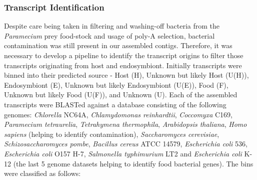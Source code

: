 \documentclass[a4paper,11pt]{article}
\begin{document}
\subsubsection{Transcript Identification}
Despite care being taken in filtering and washing-off bacteria from the \textit{Paramecium} prey food-stock and usage of poly-A selection, bacterial contamination was still present in our assembled contigs.  
Therefore, it was necessary to develop a pipeline to identify the transcript origins to filter those transcripts originating from host and endosymbiont. 
Initially transcripts were binned into their predicted source - Host (H), Unknown but likely Host (U(H)), Endosymbiont (E), Unknown but likely Endosymbiont (U(E)), Food (F), Unknown but likely Food (U(F)), and Unknown (U).  
Each of the assembled transcripts were BLASTed against a database consisting of the following genomes: \textit{Chlorella} NC64A, \textit{Chlamydomonas reinhardtii}, \textit{Coccomyxa} C169, \textit{Paramecium tetraurelia}, \textit{Tetrahymena thermophila},  \textit{Arabidopsis thaliana}, \textit{Homo sapiens} (helping to identify contamination), \textit{Saccharomyces cerevisiae}, \textit{Schizosaccharomyces pombe}, \textit{Bacillus cereus} ATCC 14579, \textit{Escherichia coli} 536, \textit{Escherichia coli} O157 H-7, \textit{Salmonella typhimurium} LT2 and \textit{Escherichia coli} K-12 (the last 5 genome datasets helping to identify food bacterial genes).  
The bins were classified as follows:
\end{document}
